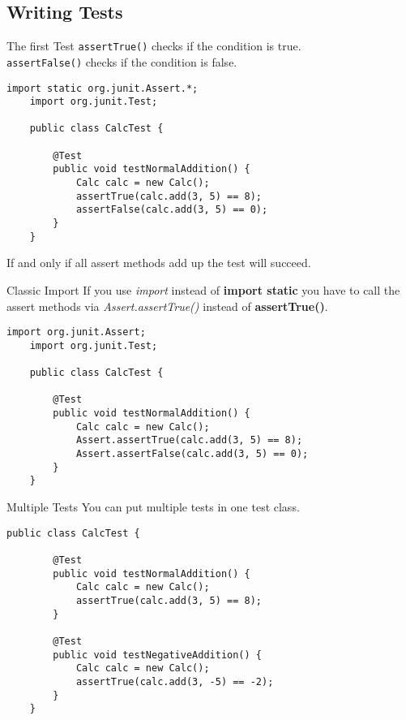 \subsection{Writing Tests}
\begin{frame}[fragile]{The first Test}
	\texttt{assertTrue()} checks if the condition is true. \\
	\texttt{assertFalse()} checks if the condition is false.
	\begin{lstlisting}[basicstyle=\ttfamily\scriptsize, escapechar=!]
	import static org.junit.Assert.*;
	import org.junit.Test;

	public class CalcTest {

	    @Test
	    public void testNormalAddition() {
	        Calc calc = new Calc();
	        assertTrue(calc.add(3, 5) == 8);
	        assertFalse(calc.add(3, 5) == 0);
	    }
	}
	\end{lstlisting}
	If and only if all assert methods add up the test will succeed.
\end{frame}

\begin{frame}[fragile]{Classic Import}
	If you use \emph{import} instead of \textbf{import static} you have to call 
	the assert methods via \emph{Assert.assertTrue()} instead of \textbf{assertTrue()}.
	\begin{lstlisting}[basicstyle=\ttfamily\scriptsize, escapechar=!]
	import org.junit.Assert;
	import org.junit.Test;

	public class CalcTest {

	    @Test
	    public void testNormalAddition() {
	        Calc calc = new Calc();
	        Assert.assertTrue(calc.add(3, 5) == 8);
	        Assert.assertFalse(calc.add(3, 5) == 0);
	    }
	}
	\end{lstlisting}
\end{frame}

\begin{frame}[fragile]{Multiple Tests}
	You can put multiple tests in one test class.
	\begin{lstlisting}[basicstyle=\ttfamily\scriptsize, escapechar=!]
	public class CalcTest {

	    @Test
	    public void testNormalAddition() {
	        Calc calc = new Calc();
	        assertTrue(calc.add(3, 5) == 8);
	    }

	    @Test
	    public void testNegativeAddition() {
	        Calc calc = new Calc();
	        assertTrue(calc.add(3, -5) == -2);
	    }
	}
	\end{lstlisting}
\end{frame}

